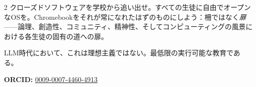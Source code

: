 \documentclass[11pt, a4paper]{article}
\begin{document}
\begin{multicols}{2}
クローズドソフトウェアを学校から追い出せ。すべての生徒に自由でオープンなOSを。Chromebookをそれが常になれたはずのものにしよう：柵ではなく\emph{扉}——論理、創造性、コミュニティ、精神性、そしてコンピューティングの風景における各生徒の固有の道への扉。

LLM時代において、これは理想主義ではない。最低限の実行可能な教育である。

\vspace{0.5em}
\noindent\textbf{ORCID:} \href{https://orcid.org/0009-0007-4460-4913}{0009-0007-4460-4913}

\end{multicols}




\end{document}
